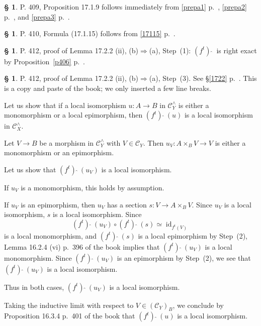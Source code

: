 \documentclass[12pt]{article}%
\theoremstyle{remark}
\theoremstyle{definition}
\newtheorem{s}[thm]{\S}%
\newcommand{\C}{\mathcal C}
\newcommand{\fthat}{(f^t)\ \widehat{}\ }
\newcommand{\then}{\Rightarrow}
\DeclareMathOperator{\id}{id}
\begin{document}
%

\begin{s}
P. 409, Proposition 17.1.9 follows immediately from \eqref{prepa1} p.~\pageref{prepa1}, \eqref{prepa2} p.~\pageref{prepa2}, and \eqref{prepa3} p.~\pageref{prepa3}.
\end{s}

%

\begin{s}\label{17115b}
P. 410, Formula (17.1.15) follows from \eqref{17115} p.~\pageref{17115}.
\end{s}

%

\begin{s}
P. 412, proof of Lemma 17.2.2 (ii), (b)$\then$(a), Step~(1): $\fthat$ is right exact by Proposition~\ref{p406} p.~\pageref{p406}.
\end{s}

%

\begin{s}
P. 412, proof of Lemma 17.2.2 (ii), (b)$\then$(a), Step~(3). See \S\ref{1722} p.~\pageref{1722}. This is a copy and paste of the book; we only inserted a few line breaks.

Let us show that if a local isomorphism $u:A\to B$ in $\C_Y^\wedge$ is either a monomorphism or a local epimorphism, then $\fthat(u)$ is a local isomorphism in $\C_X^\wedge$. 

Let $V\to B$ be a morphism in $\C_Y^\wedge$ with $V\in\C_Y$. Then $u_V: A\times_BV\to V$ is either a monomorphism or an epimorphism. 

Let us show that $\fthat(u_V)$ is a local isomorphism. 

If $u_V$ is a monomorphism, this holds by assumption. 

If $u_V$ is an epimorphism, then $u_V$ has a section $s:V\to A\times_BV$. Since $u_V$ is a local isomorphism, $s$ is a local isomorphism. Since 
$$
\fthat(u_V)\circ\fthat(s)\simeq\id_{f^t(V)}
$$ 
is a local monomorphism, and $\fthat(s)$ is a local epimorphism by Step~(2), Lemma 16.2.4 (vi) p.~396 of the book implies that $\fthat(u_V)$ is a local monomorphism. Since $\fthat(u_V)$ is an epimorphism by Step~(2), we see that $\fthat(u_V)$ is a local isomorphism. 

Thus in both cases, $\fthat(u_V)$ is a local isomorphism. 

Taking the inductive limit with respect to $V\in(\C_Y)_B$, we conclude by Proposition 16.3.4 p.~401 of the book that $\fthat(u)$ is a local isomorphism. 
\end{s}
\end{document}
